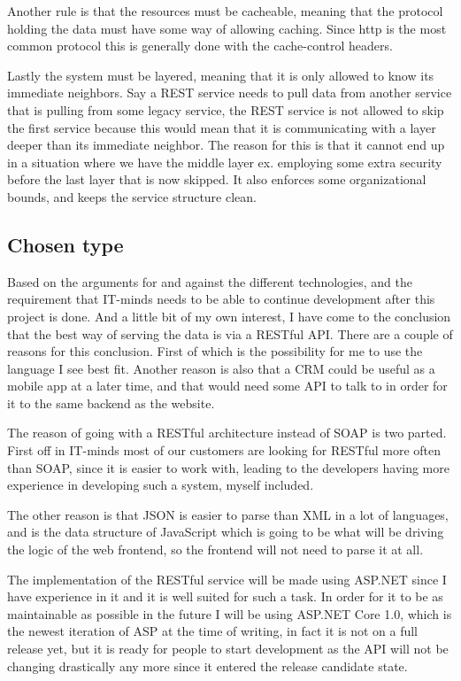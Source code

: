 Another rule is that the resources must be cacheable, meaning that the protocol holding the data must have some way of allowing caching. Since http is the most common protocol this is generally done with the cache-control headers\cite{rest:elkstein:architeture}.

Lastly the system must be layered\cite{rest:uci}, meaning that it is only allowed to know its immediate neighbors. Say a REST service needs to pull data from another service that is pulling from some legacy service, the REST service is not allowed to skip the first service because this would mean that it is communicating with a layer deeper than its immediate neighbor. The reason for this is that it cannot end up in a situation where we have the middle layer ex. employing some extra security before the last layer that is now skipped. It also enforces some organizational bounds, and keeps the service structure clean.

\subsection{Chosen type }
\label{sub:Chosen type}
Based on the arguments for and against the different technologies, and the requirement that IT-minds needs to be able to continue development after this project is done. And a little bit of my own interest, I have come to the conclusion that the best way of serving the data is via a RESTful API. There are a couple of reasons for this conclusion. First of which is the possibility for me to use the language I see best fit. Another reason is also that a CRM could be useful as a mobile app at a later time, and that would need some API to talk to in order for it to the same backend as the website.

The reason of going with a RESTful architecture instead of SOAP is two parted. First off in IT-minds most of our customers are looking for RESTful more often than SOAP, since it is easier to work with, leading to the developers having more experience in developing such a system, myself included.

The other reason is that JSON is easier to parse than XML in a lot of languages, and is the data structure of  JavaScript which is going to be what will be driving the logic of the web frontend, so the frontend will not need to parse it at all.

The implementation of the RESTful service will be made using ASP.NET since I have experience in it and it is well suited for such a task. 
In order for it to be as maintainable as possible in the future I will be using ASP.NET Core 1.0, which is the newest iteration of ASP at the time of writing, in fact it is not on a full release yet, but it is ready for people to start development as the API will not be changing drastically any more since it entered the release candidate state\cite{asp_core_1:roadmap}.

